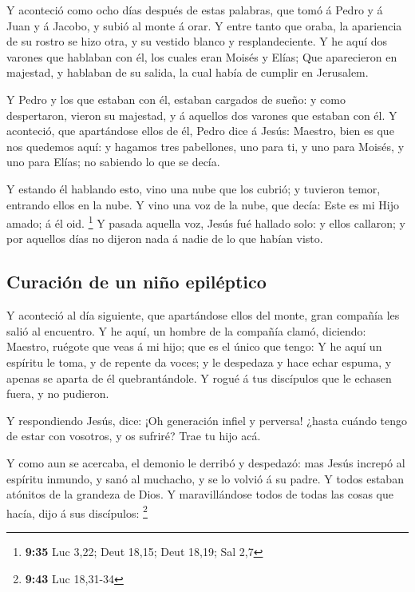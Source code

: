  Y aconteció como ocho días después de estas palabras, que
tomó á Pedro y á Juan y á Jacobo, y subió al monte á orar. 
Y entre tanto que oraba, la apariencia de su rostro se hizo otra, y su
vestido blanco y resplandeciente.  Y he aquí dos varones
que hablaban con él, los cuales eran Moisés y Elías;  Que
aparecieron en majestad, y hablaban de su salida, la cual había de
cumplir en Jerusalem.

 Y Pedro y los que estaban con él, estaban cargados de
sueño: y como despertaron, vieron su majestad, y á aquellos dos varones
que estaban con él.  Y aconteció, que apartándose ellos de
él, Pedro dice á Jesús: Maestro, bien es que nos quedemos aquí: y
hagamos tres pabellones, uno para ti, y uno para Moisés, y uno para
Elías; no sabiendo lo que se decía.

 Y estando él hablando esto, vino una nube que los cubrió;
y tuvieron temor, entrando ellos en la nube.  Y vino una
voz de la nube, que decía: Este es mi Hijo amado; á él oid. \footnote{\textbf{9:35}
  Luc 3,22; Deut 18,15; Deut 18,19; Sal 2,7}  Y pasada
aquella voz, Jesús fué hallado solo: y ellos callaron; y por aquellos
días no dijeron nada á nadie de lo que habían visto.

\hypertarget{curaciuxf3n-de-un-niuxf1o-epiluxe9ptico}{%
\subsection{Curación de un niño
epiléptico}\label{curaciuxf3n-de-un-niuxf1o-epiluxe9ptico}}

 Y aconteció al día siguiente, que apartándose ellos del
monte, gran compañía les salió al encuentro.  Y he aquí, un
hombre de la compañía clamó, diciendo: Maestro, ruégote que veas á mi
hijo; que es el único que tengo:  Y he aquí un espíritu le
toma, y de repente da voces; y le despedaza y hace echar espuma, y
apenas se aparta de él quebrantándole.  Y rogué á tus
discípulos que le echasen fuera, y no pudieron.

 Y respondiendo Jesús, dice: ¡Oh generación infiel y
perversa! ¿hasta cuándo tengo de estar con vosotros, y os sufriré? Trae
tu hijo acá.

 Y como aun se acercaba, el demonio le derribó y despedazó:
mas Jesús increpó al espíritu inmundo, y sanó al muchacho, y se lo
volvió á su padre.  Y todos estaban atónitos de la grandeza
de Dios. Y maravillándose todos de todas las cosas que hacía, dijo á sus
discípulos: \footnote{\textbf{9:43} Luc 18,31-34}

